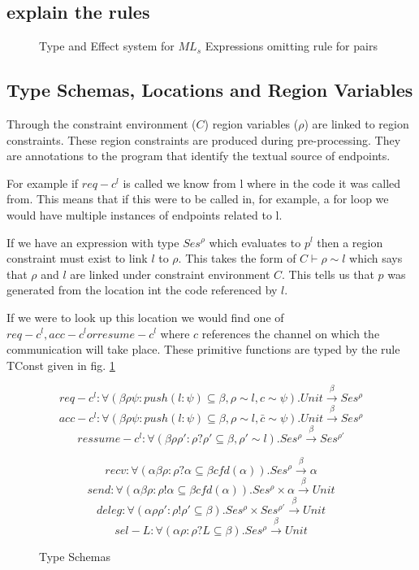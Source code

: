 \subsection{explain the rules} 

\begin{figure}
\caption{Type and Effect system for $ML_s$ Expressions omitting rule for pairs}
\label{typeAndEffect}
\end{figure}

\subsection{Type Schemas, Locations and Region Variables}

Through the constraint environment ($C$) region variables ($\rho$) are linked to region constraints. These region constraints are produced during pre-processing. They are annotations to the program that identify the textual source of endpoints. 

For example if $req-c^l$ is called we know from l where in the code it was called from. This means that if this were to be called in, for example, a for loop we would have multiple instances of endpoints related to l. 

If we have an expression with type $Ses^\rho$ which evaluates to $p^l$ then a region constraint must exist to link $l$ to $\rho$. This takes the form of $C\vdash \rho  \sim l$ which says that $\rho$ and $l$ are linked under constraint environment $C$. This tells us that $p$ was generated from the location int the code referenced by $l$.

If we were to look up this location we would find one of $req-c^l, acc-c^l or resume-c^l$ where $c$ references the channel on which the communication will take place. These primitive functions are typed by the rule TConst given in fig. \ref{typeAndEffect}

\begin{figure}
$$req-c^l :  \forall(\beta \rho \psi:push(l:\psi) \subseteq \beta, \rho \sim l, c \sim \psi).Unit  \overset{\beta}{\rightarrow} Ses^\rho$$
$$acc-c^l :  \forall(\beta \rho \psi:push(l:\psi) \subseteq \beta, \rho \sim l, \bar{c} \sim \psi).Unit  \overset{\beta}{\rightarrow} Ses^\rho$$
$$ressume-c^l :  \forall(\beta \rho \rho':\rho ? \rho' \subseteq \beta, \rho' \sim l).Ses^{\rho}  \overset{\beta}{\rightarrow} Ses^{\rho'}$$


$$recv : \forall(\alpha \beta \rho : \rho ? \alpha \subseteq \beta cfd(\alpha)).Ses^{\rho} \overset{\beta}{\rightarrow} \alpha$$
$$send : \forall(\alpha \beta \rho : \rho ! \alpha \subseteq \beta cfd(\alpha)).Ses^{\rho} \times \alpha \overset{\beta}{\rightarrow} Unit$$
$$deleg : \forall(\alpha \rho \rho' : \rho ! \rho' \subseteq \beta ).Ses^{\rho} \times Ses^{\rho'} \overset{\beta}{\rightarrow} Unit$$
$$sel-L : \forall(\alpha \rho : \rho ? L \subseteq \beta ).Ses^{\rho}  \overset{\beta}{\rightarrow} Unit$$
\caption{Type Schemas}
\label{ts}
\end{figure}

